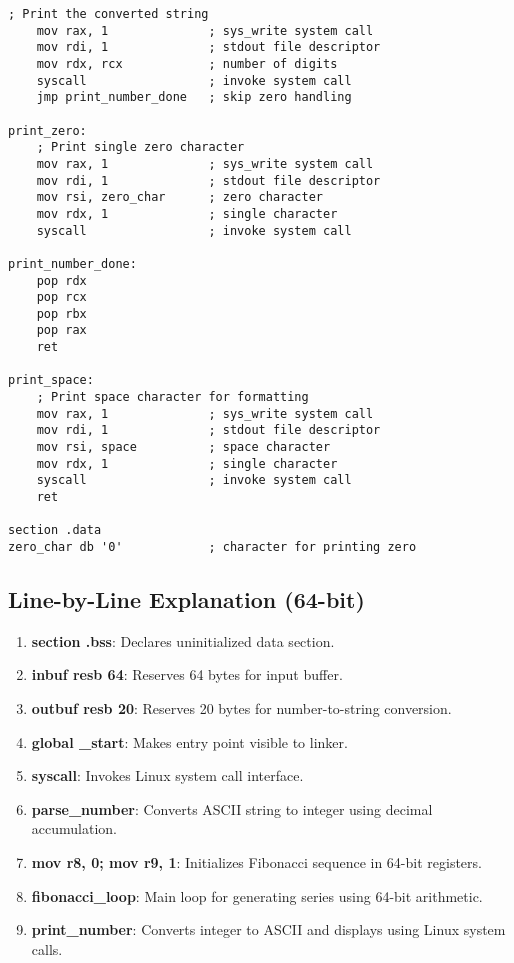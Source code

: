 \documentclass[12pt,a4paper]{article}
\begin{document}
\begin{lstlisting}[caption=64-bit Fibonacci Series Program]
    ; Print the converted string
    mov rax, 1              ; sys_write system call
    mov rdi, 1              ; stdout file descriptor
    mov rdx, rcx            ; number of digits
    syscall                 ; invoke system call
    jmp print_number_done   ; skip zero handling

print_zero:
    ; Print single zero character
    mov rax, 1              ; sys_write system call
    mov rdi, 1              ; stdout file descriptor
    mov rsi, zero_char      ; zero character
    mov rdx, 1              ; single character
    syscall                 ; invoke system call

print_number_done:
    pop rdx
    pop rcx
    pop rbx
    pop rax
    ret

print_space:
    ; Print space character for formatting
    mov rax, 1              ; sys_write system call
    mov rdi, 1              ; stdout file descriptor
    mov rsi, space          ; space character
    mov rdx, 1              ; single character
    syscall                 ; invoke system call
    ret

section .data
zero_char db '0'            ; character for printing zero
\end{lstlisting}

\subsection{Line-by-Line Explanation (64-bit)}

\begin{enumerate}
\item \textbf{section .bss}: Declares uninitialized data section.
\item \textbf{inbuf resb 64}: Reserves 64 bytes for input buffer.
\item \textbf{outbuf resb 20}: Reserves 20 bytes for number-to-string conversion.
\item \textbf{global \_start}: Makes entry point visible to linker.
\item \textbf{syscall}: Invokes Linux system call interface.
\item \textbf{parse\_number}: Converts ASCII string to integer using decimal accumulation.
\item \textbf{mov r8, 0; mov r9, 1}: Initializes Fibonacci sequence in 64-bit registers.
\item \textbf{fibonacci\_loop}: Main loop for generating series using 64-bit arithmetic.
\item \textbf{print\_number}: Converts integer to ASCII and displays using Linux system calls.
\end{enumerate}
\end{document}

